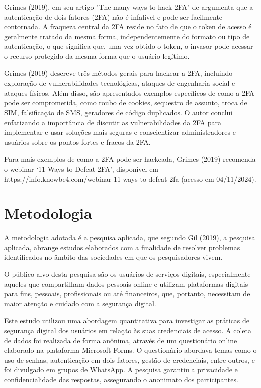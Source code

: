 \documentclass[12pt]{article}
\begin{document}
Grimes (2019), em seu artigo "The many ways to hack 2FA" de argumenta que a
autenticação de dois fatores (2FA) não é infalível e pode ser facilmente
contornada.
A fraqueza central da 2FA reside no fato de que o token de acesso é
geralmente tratado da mesma forma, independentemente do formato ou tipo de
autenticação, o que significa que, uma vez obtido o token, o invasor pode
acessar o recurso protegido da mesma forma que o usuário legítimo.


Grimes (2019) descreve três métodos gerais para hackear a 2FA, incluindo
exploração de vulnerabilidades tecnológicas, ataques de engenharia social
e ataques físicos.
Além disso, são apresentados exemplos específicos de como a 2FA pode ser
comprometida, como roubo de cookies, sequestro de assunto, troca de SIM,
falsificação de SMS, geradores de código duplicados.
O autor conclui enfatizando a importância de discutir
as vulnerabilidades da 2FA para implementar e usar soluções mais seguras
e conscientizar administradores e usuários sobre os pontos fortes e fracos
da 2FA.

Para mais exemplos de como a 2FA pode ser hackeada, Grimes (2019) recomenda
o webinar ‘11 Ways to Defeat 2FA’, disponível em
https://info.knowbe4.com/webinar-11-ways-to-defeat-2fa (acesso em 04/11/2024).

\section{Metodologia}

A metodologia adotada é a pesquisa aplicada, que segundo Gil (2019), a
pesquisa aplicada, abrange estudos elaborados com a finalidade de resolver
problemas identificados no âmbito das sociedades em que os pesquisadores
vivem.

O público-alvo desta pesquisa são os usuários de serviços digitais,
especialmente aqueles que compartilham dados pessoais online e utilizam
plataformas digitais para fins, pessoais, profissionais ou até financeiros,
que, portanto, necessitam de maior atenção e cuidado com a segurança digital.

Este estudo utilizou uma abordagem quantitativa para investigar as práticas
de segurança digital dos usuários em relação às suas credenciais de acesso.
A coleta de dados foi realizada de forma anônima, através de um questionário
online elaborado na plataforma Microsoft Forms.
O questionário abordava temas como o uso de senhas, autenticação em dois
fatores, gestão de credenciais, entre outros, e foi divulgado em grupos de
WhatsApp.
A pesquisa garantiu a privacidade e confidencialidade das respostas,
assegurando o anonimato dos participantes.
\end{document}
